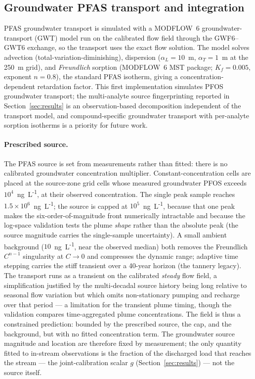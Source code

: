 \subsection{Groundwater PFAS transport and integration}
\label{sec:pfas}

PFAS groundwater transport is simulated with a MODFLOW~6 groundwater-transport (GWT) model run on the
calibrated flow field through the GWF6--GWT6 exchange, so the transport uses the exact flow solution.
The model solves advection (total-variation-diminishing), dispersion ($\alpha_L=10$~m, $\alpha_T=1$~m
at the 250~m grid), and \emph{Freundlich} sorption (MODFLOW~6 MST package; $K_f=0.005$, exponent
$n=0.8$), the standard PFAS isotherm, giving a concentration-dependent retardation factor. This first
implementation simulates PFOS groundwater transport; the multi-analyte source fingerprinting reported in
Section~\ref{sec:results} is an observation-based decomposition independent of the transport model, and
compound-specific groundwater transport with per-analyte sorption isotherms is a priority for future work.

\paragraph{Prescribed source.} The PFAS source is set from measurements rather than fitted: there is
no calibrated groundwater concentration multiplier. Constant-concentration cells are placed at the
source-zone grid cells whose measured groundwater PFOS exceeds $10^4$~ng~L\textsuperscript{-1}, at
their observed concentration. The single peak sample reaches $1.5\times10^6$~ng~L\textsuperscript{-1};
the source is capped at $10^5$~ng~L\textsuperscript{-1}, because that one peak makes the
six-order-of-magnitude front numerically intractable and because the log-space validation tests the
plume \emph{shape} rather than the absolute peak (the source magnitude carries the single-sample
uncertainty). A small ambient background ($10$~ng~L\textsuperscript{-1}, near the observed median)
both removes the Freundlich $C^{n-1}$ singularity at $C\to0$ and compresses the dynamic range;
adaptive time stepping carries the stiff transient over a 40-year horizon (the tannery legacy). The
transport runs as a transient on the calibrated \emph{steady} flow field, a simplification justified
by the multi-decadal source history being long relative to seasonal flow variation but which omits
non-stationary pumping and recharge over that period --- a limitation for the transient plume timing,
though the validation compares time-aggregated plume concentrations. The field is thus a constrained
prediction: bounded by the prescribed source, the cap, and the background, but with no fitted
concentration term. The groundwater source magnitude and location are therefore fixed by measurement;
the only quantity fitted to in-stream observations is the fraction of the discharged load that reaches
the stream --- the joint-calibration scalar $g$ (Section~\ref{sec:results}) --- not the source itself.

